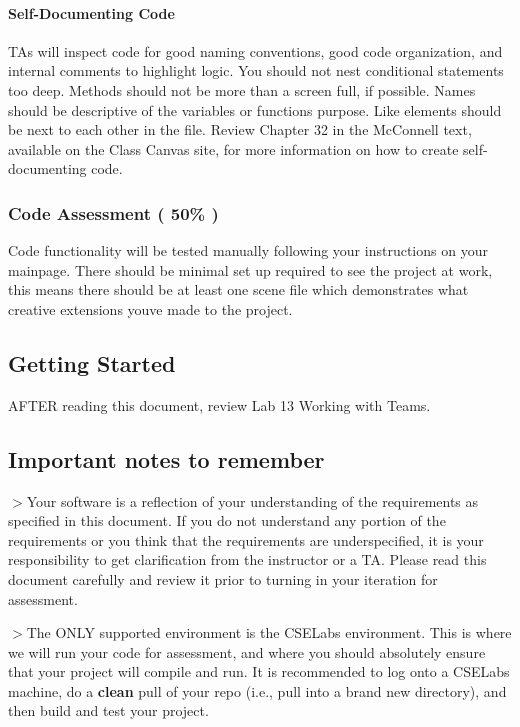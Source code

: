 \paragraph*{Self-\/\+Documenting Code}

T\+As will inspect code for good naming conventions, good code organization, and internal comments to highlight logic. You should not nest conditional statements too deep. Methods should not be more than a screen full, if possible. Names should be descriptive of the variable\textquotesingle{}s or function\textquotesingle{}s purpose. Like elements should be next to each other in the file. Review Chapter 32 in the Mc\+Connell text, available on the Class Canvas site, for more information on how to create self-\/documenting code.

\subsubsection*{Code Assessment ( 50\% )}

Code functionality will be tested manually following your instructions on your mainpage. There should be minimal set up required to see the project at work, this means there should be at least one scene file which demonstrates what creative extensions you\textquotesingle{}ve made to the project.





\subsection*{Getting Started}

A\+F\+T\+ER reading this document, review Lab 13 Working with Teams.





\subsection*{Important notes to remember}

$>$Your software is a reflection of your understanding of the requirements as specified in this document. If you do not understand any portion of the requirements or you think that the requirements are underspecified, it is your responsibility to get clarification from the instructor or a TA. Please read this document carefully and review it prior to turning in your iteration for assessment.

$>$The O\+N\+LY supported environment is the C\+S\+E\+Labs environment. This is where we will run your code for assessment, and where you should absolutely ensure that your project will compile and run. It is recommended to log onto a C\+S\+E\+Labs machine, do a {\bfseries clean} pull of your repo (i.\+e., pull into a brand new directory), and then build and test your project.





